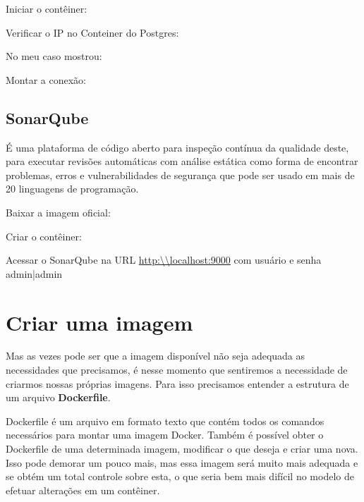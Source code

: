 \documentclass[a4paper,11pt]{article}
\begin{document}
Iniciar o contêiner: \\

Verificar o IP no Conteiner do Postgres: \\

No meu caso mostrou: \\

Montar a conexão: \\

\subsection{SonarQube}
É uma plataforma de código aberto para inspeção contínua da qualidade deste, para executar revisões automáticas com análise estática como forma de encontrar problemas, erros e vulnerabilidades de segurança que pode ser usado em mais de 20 linguagens de programação.

Baixar a imagem oficial: \\

Criar o contêiner: \\

Acessar o SonarQube na URL \url{http:\\localhost:9000} com usuário e senha admin|admin

\section{Criar uma imagem}
Mas as vezes pode ser que a imagem disponível não seja adequada as necessidades que precisamos, é nesse momento que sentiremos a necessidade de criarmos nossas próprias imagens. Para isso precisamos entender a estrutura de um arquivo \textbf{Dockerfile}.

Dockerfile é um arquivo em formato texto que contém todos os comandos necessários para montar uma imagem Docker. Também é possível obter o Dockerfile de uma determinada imagem, modificar o que deseja e criar uma nova. Isso pode demorar um pouco mais, mas essa imagem será muito mais adequada e se obtém um total controle sobre esta, o que seria bem mais difícil no modelo de efetuar alterações em um contêiner.
\end{document}
